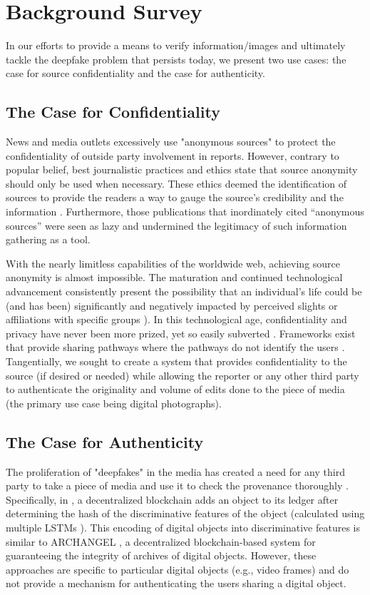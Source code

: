 \section{Background Survey}
\label{sec:survey}

In our efforts to provide a means to verify information/images and ultimately tackle the deepfake problem that persists today, we present two use cases: the case for source confidentiality and the case for authenticity.

\subsection{The Case for Confidentiality}
News and media outlets excessively use "anonymous sources" to protect the confidentiality of outside party involvement in reports. However, contrary to popular belief, best journalistic practices and ethics state that source anonymity should only be used when necessary. These ethics deemed the identification of sources to provide the readers a way to gauge the source's credibility and the information \cite{wulfemeyer83}. Furthermore, those publications that inordinately cited \enquote{anonymous sources} were seen as lazy and undermined the legitimacy of such information gathering as a tool.

With the nearly limitless capabilities of the worldwide web, achieving source anonymity is almost impossible. The maturation and continued technological advancement consistently present the possibility that an individual's life could be (and has been) significantly and negatively impacted by perceived slights or affiliations with specific groups \cite{svana18}). In this technological age, confidentiality and privacy have never been more prized, yet so easily subverted \cite{svana18, durity05}. Frameworks exist that provide sharing pathways where the pathways do not identify the users \cite{cvppfr19, tccn13}. Tangentially, we sought to create a system that provides confidentiality to the source (if desired or needed) while allowing the reporter or any other third party to authenticate the originality and volume of edits done to the piece of media (the primary use case being digital photographs).

\subsection{The Case for Authenticity}
The proliferation of "deepfakes" in the media has created a need for any third party to take a piece of media and use it to check the provenance thoroughly \cite{ckdg20}. Specifically, in \cite{ckdg20}, a decentralized blockchain adds an object to its ledger after determining the hash of the discriminative features of the object (calculated using multiple LSTMs \cite{lstm}). This encoding of digital objects into discriminative features is similar to ARCHANGEL \cite{archangel}, a decentralized blockchain-based system for guaranteeing the integrity of archives of digital objects. However, these approaches are specific to particular digital objects (e.g., video frames) and do not provide a mechanism for authenticating the users sharing a digital object. 

